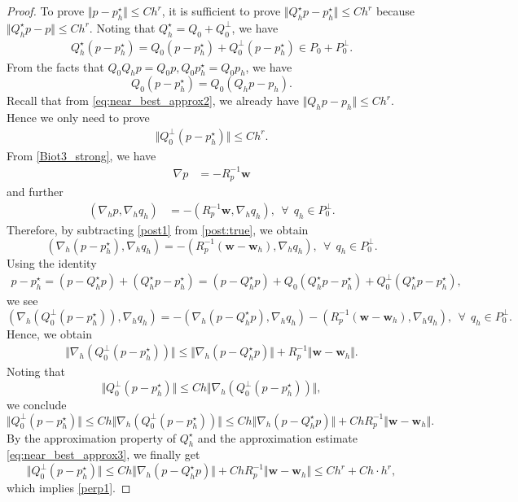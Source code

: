 \documentclass[11pt]{amsart}
\theoremstyle{remark}
\theoremstyle{definition}
\def\bw{{\boldsymbol w}}
\def\bw{\boldsymbol w}
\begin{document}
\begin{proof}
To prove $\Vert p-p_h^\star\Vert\le C h^r$, it is sufficient to prove $\Vert Q_h^\star p-p_h^\star\Vert\le C h^r$ because $\Vert Q_h^\star p-p\Vert\le C h^r$. 
Noting that $Q_h^\star =Q_0+Q_0^\perp$, we have 
\begin{align}
Q_h^\star (p-p_h^\star)=Q_0(p-p_h^\star)+Q_0^\perp(p-p_h^\star)\in P_0+P_0^\perp. 
\end{align}
From the facts that $Q_0Q_hp=Q_0p, Q_0p_h^\star=Q_0p_h$, we have 
$$
Q_0(p-p_h^\star)=Q_0(Q_hp-p_h). 
$$
Recall that from \eqref{eq:near_best_approx2}, we already have $\Vert Q_hp-p_h\Vert\le Ch^r$. Hence we only need to prove 
\begin{align}\label{perp1}
\Vert Q_0^\perp(p-p_h^\star) \Vert \le Ch^r.
\end{align}
From \eqref{Biot3_strong}, we have 
\begin{align}
\nabla p&=-R_p^{-1}  \bw \end{align}
 and further 
 \begin{align}\label{post:true}
(\nabla_h p, \nabla_h q_h)&=-(R_p^{-1}\bw, \nabla_h q_h), ~~\forall~~q_h\in P_0^\perp.
\end{align}
Therefore, by subtracting \eqref{post1} from \eqref{post:true}, we obtain
$$
(\nabla_h (p-p_h^\star), \nabla_h q_h)=-(R_p^{-1}(\bw-\bw_h), \nabla_h q_h), ~~\forall~~q_h\in P_0^\perp.
$$
Using the identity
\begin{align}
p-p_h^\star=(p-Q_h^\star p)+(Q_h^\star p-p_h^\star)=(p-Q_h^\star p)+Q_0(Q_h^\star p-p_h^\star)+Q_0^\perp(Q_h^\star p-p_h^\star),
\end{align}
we see
$$
(\nabla_h (Q_0^\perp (p-p_h^\star)), \nabla_h q_h)=-(\nabla_h (p-Q_h^\star p), \nabla_h q_h)-(R_p^{-1}(\bw-\bw_h), \nabla_h q_h), ~~\forall~~q_h\in P_0^\perp.
$$
Hence, we obtain 
\begin{align}
\Vert \nabla_h (Q_0^\perp (p-p_h^\star))\Vert \le \Vert \nabla_h (p-Q_h^\star p)\Vert +R^{-1}_p\Vert \bw-\bw_h\Vert.
\end{align}
Noting that 
$$
\Vert Q_0^\perp (p-p_h^\star)\Vert \le  C h \Vert \nabla_h (Q_0^\perp (p-p_h^\star))\Vert, 
$$
we conclude 
$$
\Vert Q_0^\perp (p-p_h^\star)\Vert \le C h \Vert \nabla_h (Q_0^\perp (p-p_h^\star))\Vert \le C h\Vert \nabla_h (p-Q_h^\star p)\Vert +C h R^{-1}_p\Vert \bw-\bw_h\Vert. 
$$
By the approximation property of $Q_h^\star $ and the approximation estimate \eqref{eq:near_best_approx3}, we finally get 
$$
\Vert Q_0^\perp (p-p_h^\star)\Vert  \le C h\Vert \nabla_h (p-Q_h^\star p)\Vert +C h R^{-1}_p\Vert \bw-\bw_h\Vert\le Ch^r+Ch\cdot h^r,
$$
which implies \eqref{perp1}.
\end{proof}
\end{document}
